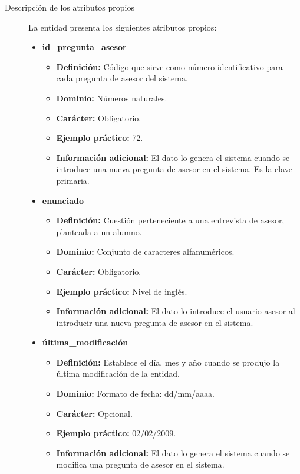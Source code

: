 \begin{description}
   \item[Descripción de los atributos propios] La entidad presenta los siguientes
   atributos propios:

   \begin{itemize}
    \item \textbf{id\_pregunta\_asesor}
      \begin{itemize}
         \item \textbf{Definición:} Código que sirve como número identificativo
               para cada pregunta de asesor del sistema.
         \item \textbf{Dominio:} Números naturales.
         \item \textbf{Carácter:} Obligatorio.
         \item \textbf{Ejemplo práctico:} 72.
         \item \textbf{Información adicional:} El dato lo genera el sistema
               cuando se introduce una nueva pregunta de asesor en el sistema.
               Es la clave primaria.
      \end{itemize}
   \item \textbf{enunciado}
      \begin{itemize}
         \item \textbf{Definición:} Cuestión perteneciente a una entrevista
         de asesor, planteada a un alumno.
         \item \textbf{Dominio:} Conjunto de caracteres alfanuméricos.
         \item \textbf{Carácter:} Obligatorio.
         \item \textbf{Ejemplo práctico:} Nivel de inglés.
         \item \textbf{Información adicional:} El dato lo introduce el
         usuario asesor al introducir una nueva pregunta de asesor en
         el sistema.
      \end{itemize}
    \item \textbf{última\_modificación}
      \begin{itemize}
         \item \textbf{Definición:} Establece el día, mes y año cuando se
            produjo la última modificación de la entidad.
         \item \textbf{Dominio:} Formato de fecha: dd/mm/aaaa.
         \item \textbf{Carácter:} Opcional.
         \item \textbf{Ejemplo práctico:} 02/02/2009.
         \item \textbf{Información adicional:} El dato lo genera el sistema
               cuando se modifica una pregunta de asesor en el sistema.
      \end{itemize}
   \end{itemize}


\end{description}
